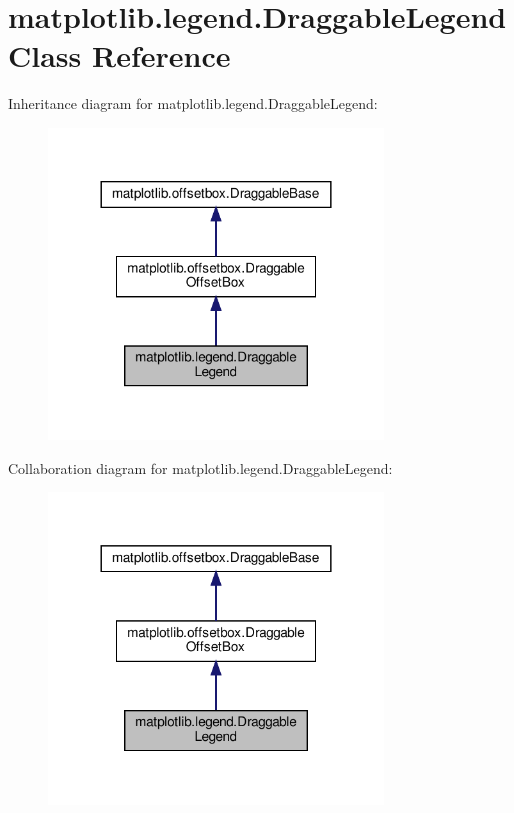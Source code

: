 \hypertarget{classmatplotlib_1_1legend_1_1DraggableLegend}{}\section{matplotlib.\+legend.\+Draggable\+Legend Class Reference}
\label{classmatplotlib_1_1legend_1_1DraggableLegend}


Inheritance diagram for matplotlib.\+legend.\+Draggable\+Legend\+:
\nopagebreak
\begin{figure}[H]
\begin{center}
\leavevmode
\includegraphics[width=252pt]{classmatplotlib_1_1legend_1_1DraggableLegend__inherit__graph}
\end{center}
\end{figure}


Collaboration diagram for matplotlib.\+legend.\+Draggable\+Legend\+:
\nopagebreak
\begin{figure}[H]
\begin{center}
\leavevmode
\includegraphics[width=252pt]{classmatplotlib_1_1legend_1_1DraggableLegend__coll__graph}
\end{center}
\end{figure}
